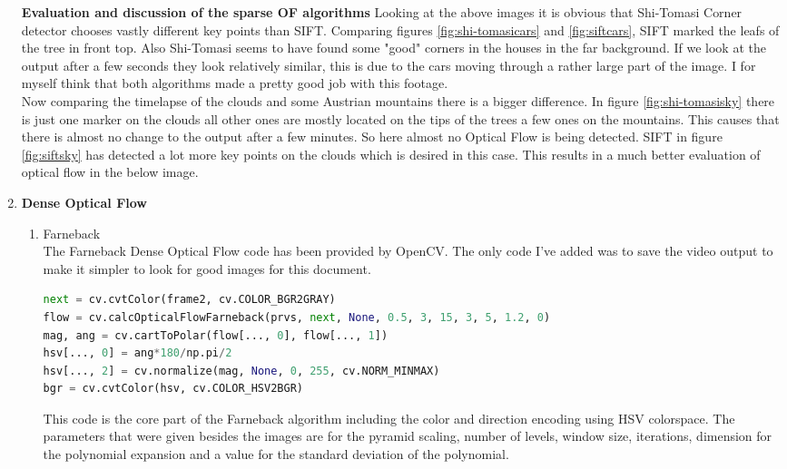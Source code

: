 \documentclass[UTF-8]{article}
\begin{document}
\begin{enumerate}[{Part} a.]
\textbf{Evaluation and discussion of the sparse OF algorithms}
Looking at the above images it is obvious that Shi-Tomasi Corner detector chooses vastly different key points than SIFT. Comparing figures \ref{fig:shi-tomasicars} and \ref{fig:siftcars}, SIFT marked the leafs of the tree in front top. Also Shi-Tomasi seems to have found some "good" corners in the houses in the far background. If we look at the output after a few seconds they look relatively similar, this is due to the cars moving through a rather large part of the image. I for myself think that both algorithms made a pretty good job with this footage.\\
Now comparing the timelapse of the clouds and some Austrian mountains there is a bigger difference. In figure \ref{fig:shi-tomasisky} there is just one marker on the clouds all other ones are mostly located on the tips of the trees a few ones on the mountains. This causes that there is almost no change to the output after a few minutes. So here almost no Optical Flow is being detected.
SIFT in figure \ref{fig:siftsky} has detected a lot more key points on the clouds which is desired in this case. This results in a much better evaluation of optical flow in the below image.
	
	\item \textbf{Dense Optical Flow}
	\begin{enumerate}[1.]
		\item Farneback\\
		The Farneback Dense Optical Flow code has been provided by OpenCV. The only code I've added was to save the video output to make it simpler to look for good images for this document.
\begin{lstlisting}[language=python]
next = cv.cvtColor(frame2, cv.COLOR_BGR2GRAY)
flow = cv.calcOpticalFlowFarneback(prvs, next, None, 0.5, 3, 15, 3, 5, 1.2, 0)
mag, ang = cv.cartToPolar(flow[..., 0], flow[..., 1])
hsv[..., 0] = ang*180/np.pi/2
hsv[..., 2] = cv.normalize(mag, None, 0, 255, cv.NORM_MINMAX)
bgr = cv.cvtColor(hsv, cv.COLOR_HSV2BGR)
\end{lstlisting}
This code is the core part of the Farneback algorithm including the color and direction encoding using HSV colorspace. The parameters that were given besides the images are for the pyramid scaling, number of levels, window size, iterations, dimension for the polynomial expansion and a value for the standard deviation of the polynomial.
		

\end{enumerate}
\end{enumerate}
\end{document}
